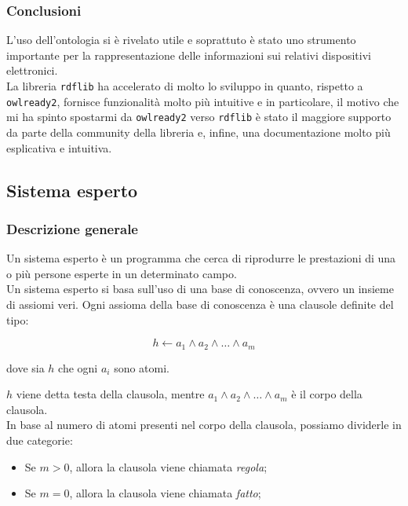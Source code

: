 \documentclass[12pt, letterpaper]{article}
\begin{document}
\subsubsection{Conclusioni}

\noindent L'uso dell'ontologia si è rivelato utile e soprattuto è stato uno strumento importante per la rappresentazione
delle informazioni sui relativi dispositivi elettronici. \\

\noindent La libreria \texttt{rdflib} ha accelerato di molto lo sviluppo in quanto, rispetto
a \texttt{owlready2}, fornisce funzionalità molto più intuitive e in particolare, il motivo che mi
ha spinto spostarmi da \texttt{owlready2} verso \texttt{rdflib} è stato il maggiore supporto da parte
della community della libreria e, infine, una documentazione molto più esplicativa e intuitiva. \\

\subsection{Sistema esperto}

\subsubsection{Descrizione generale}

\noindent Un sistema esperto è un programma che cerca di riprodurre le prestazioni di una o più
persone esperte in un determinato campo. \\

\noindent Un sistema esperto si basa sull'uso di una base di conoscenza, ovvero un insieme
di assiomi veri. Ogni assioma della base di conoscenza è una clausole definite del tipo:

\[ h \leftarrow a_1 \land  a_2 \land \dots \land a_m \]

\noindent dove sia $h$ che ogni $a_i$ sono atomi.

\noindent $h$ viene detta testa della clausola, mentre
$a_1 \land  a_2 \land \dots \land a_m$ è il corpo della clausola. \\

\noindent In base al numero di atomi presenti nel corpo della clausola, possiamo dividerle in due categorie:
\begin{itemize}
      \item Se $m > 0$, allora la clausola viene chiamata \textit{regola};
      \item Se $m = 0$, allora la clausola viene chiamata \textit{fatto};
\end{itemize}
\end{document}
